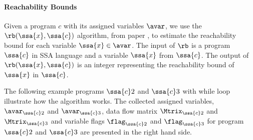 \paragraph{Reachability Bounds}
Given a program $c$ with its assigned variables $\avar$,
we use the $\rb(\ssa{x}, \ssa{c})$ algorithm, from paper \cite{10.1145/1806596.1806630}, to estimate the reachability bound for each variable $\ssa{x} \in \avar$. 
The input of $\rb$ is a program $\ssa{c}$ in SSA language and a variable $\ssa{x} $ from $\ssa{c}$.
The output of $\rb(\ssa{x}, \ssa{c})$ is an integer representing the reachability bound of $\ssa{x}$ in $\ssa{c}$.
%

%
The following example programs $\ssa{c}2$ and $\ssa{c}3$ with while loop illustrate how the algorithm works.
The collected assigned variables, $\avar_{\ssa{c}2}$ and $\avar_{\ssa{c}3}$,
data flow matrix $\Mtrix_{\ssa{c}2}$ and  $\Mtrix_{\ssa{c}3}$
and variable flags $\flag_{\ssa{c}2}$ and $\flag_{\ssa{c}3}$
for program $\ssa{c}2$ and $\ssa{c}3$
are presented in the right hand side.
%
